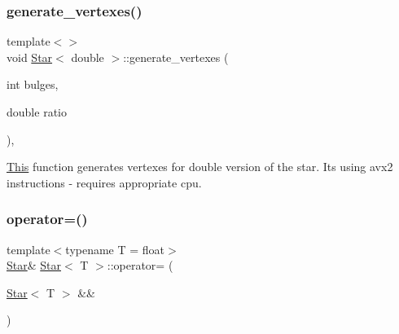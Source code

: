 \mbox{\label{classStar_a85d8438cea72701a136b76f046ee95dd}} 
\subsubsection{\texorpdfstring{generate\+\_\+vertexes()}{generate\_vertexes()}\hspace{0.1cm}{\footnotesize\ttfamily [6/6]}}
{\footnotesize\ttfamily template$<$$>$ \\
void \mbox{\hyperlink{classStar}{Star}}$<$ double $>$\+::generate\+\_\+vertexes (\begin{DoxyParamCaption}\item[{int}]{bulges,  }\item[{double}]{ratio }\end{DoxyParamCaption})\hspace{0.3cm}{\ttfamily [inline]}, {\ttfamily [private]}}



\mbox{\hyperlink{classThis}{This}} function generates vertexes for double version of the star. It\textquotesingle{}s using avx2 instructions -\/ requires appropriate cpu. 

\mbox{\label{classStar_a7113d2808314f0aa2f5a87325f8c535d}} 
\subsubsection{\texorpdfstring{operator=()}{operator=()}\hspace{0.1cm}{\footnotesize\ttfamily [1/4]}}
{\footnotesize\ttfamily template$<$typename T  = float$>$ \\
\mbox{\hyperlink{classStar}{Star}}\& \mbox{\hyperlink{classStar}{Star}}$<$ T $>$\+::operator= (\begin{DoxyParamCaption}\item[{\mbox{\hyperlink{classStar}{Star}}$<$ T $>$ \&\&}]{ }\end{DoxyParamCaption})\hspace{0.3cm}{\ttfamily [default]}}

\mbox{\label{classStar_a3507f157448e082ccfcadc4783f2610e}} 
